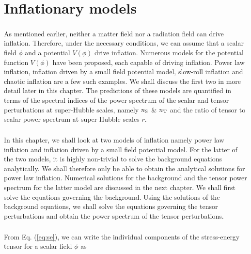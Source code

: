 \documentclass[12pt,a4paper,oneside]{book}
\begin{document}

\chapter{Inflationary models}


\paragraph*{} As mentioned earlier, neither a matter field nor a radiation field can drive inflation. Therefore, under the 
necessary conditions, we can assume that a scalar field $\phi$ and a potential $V(\phi)$ drive inflation. Numerous models 
for the potential function $V(\phi)$ have been proposed, each capable of driving inflation. Power law inflation, inflation 
driven by a small field potential model, slow-roll inflation and chaotic inflation are a few such examples. We shall discuss the first two in more 
detail later in this chapter. The predictions of these models are quantified in terms of the spectral indices of the power 
spectrum of the scalar and tensor perturbations at super-Hubble scales, namely $n_{\rm S}$ \& $n_{\rm T}$ and the ratio of tensor to scalar 
power spectrum at super-Hubble scales $r$.

\paragraph*{} In this chapter, we shall look at two models of inflation namely power law inflation 
and inflation driven by a small field potential model. For the latter of the two models, it is highly non-trivial to 
solve the background equations analytically. We shall therefore only be able to obtain the analytical solutions 
for power law inflation. Numerical solutions for the background and the tensor power spectrum for the latter model 
are discussed in the next chapter. We shall first solve the equations governing the background. Using the solutions of 
the background equations, we shall solve the equations governing the tensor perturbations and obtain the power spectrum 
of the tensor perturbations.

\paragraph*{} From Eq. (\ref{eq:se}), we can write the individual components of the stress-energy tensor for a scalar field $\phi$ as
\end{document}
